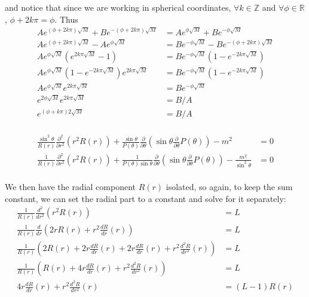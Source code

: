 \documentclass{article}	%
\theoremstyle{definition}
\begin{document}
and notice that since we are working in spherical coordinates, $\forall k\in\mathbb{Z}$ and $\forall \phi\in\mathbb{R}$, $\phi + 2k\pi = \phi$. Thus 
\begin{align*}
Ae^{(\phi+2k\pi)\sqrt{M}} +Be^{-(\phi+2k\pi)\sqrt{M}} &= Ae^{\phi\sqrt{M}} +Be^{-\phi\sqrt{M}}\\
Ae^{(\phi+2k\pi)\sqrt{M}} -Ae^{\phi\sqrt{M}} &= Be^{-\phi\sqrt{M}} -Be^{-(\phi+2k\pi)\sqrt{M}}\\
Ae^{\phi\sqrt{M}} \left( e^{2k\pi\sqrt{M}} -1\right) &= Be^{-\phi\sqrt{M}} \left( 1 -e^{-2k\pi\sqrt{M}} \right)\\
Ae^{\phi\sqrt{M}} \left( 1 -e^{-2k\pi\sqrt{M}}\right) e^{2k\pi\sqrt{M}} &= Be^{-\phi\sqrt{M}} \left( 1 -e^{-2k\pi\sqrt{M}} \right)\\
Ae^{\phi\sqrt{M}} e^{2k\pi\sqrt{M}} &= Be^{-\phi\sqrt{M}}\\
e^{2\phi\sqrt{M}} e^{2k\pi\sqrt{M}} &= B/A\\
e^{(\phi+k\pi)2\sqrt{M}} &= B/A\\
\end{align*}



\begin{align*}
\frac{\sin^{2}\theta}{R(r)} \frac{\partial^{2}}{\partial r^{2}}(r^{2}R(r)) +\frac{\sin\theta}{P(\theta)} \frac{\partial}{\partial\theta}\left( \sin\theta \frac{\partial}{\partial\theta}P(\theta) \right) -m^{2} &= 0\\
\frac{1}{R(r)} \frac{\partial^{2}}{\partial r^{2}}(r^{2}R(r)) +\frac{1}{P(\theta)\sin\theta} \frac{\partial}{\partial\theta}\left( \sin\theta \frac{\partial}{\partial\theta}P(\theta) \right) -\frac{m^{2}}{\sin^{2}\theta} &= 0\\
\end{align*}

We then have the radial component $R(r)$ isolated, so again, to keep the sum constant, we can set the radial part to a constant and solve for it separately:
\begin{align*}
\frac{1}{R(r)} \frac{d^{2}}{dr^{2}}(r^{2}R(r)) &= L\\
\frac{1}{R(r)} \frac{d}{dr}\left(2rR(r)+r^{2}\frac{dR}{dr}(r)\right) &= L\\
\frac{1}{R(r)} \left( 2R(r) +2r\frac{dR}{dr}(r) +2r\frac{dR}{dr}(r) +r^{2}\frac{d^{2}R}{dr^{2}}(r) \right) &= L\\
\frac{1}{R(r)} \left( R(r) +4r\frac{dR}{dr}(r) +r^{2}\frac{d^{2}R}{dr^{2}}(r) \right) &= L\\
4r\frac{dR}{dr}(r) +r^{2}\frac{d^{2}R}{dr^{2}}(r) &= (L-1)R(r)\\
\end{align*}
\end{document}
